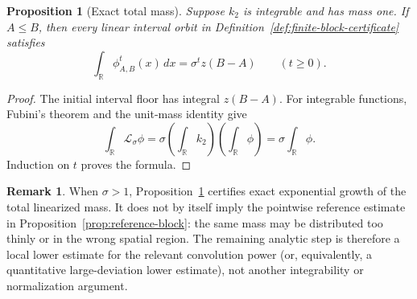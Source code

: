 \documentclass[11pt]{article}
\newtheorem{proposition}[theorem]{Proposition}
\theoremstyle{definition}
\newtheorem{remark}[theorem]{Remark}
\newcommand{\R}{\mathbb R}
\begin{document}
\begin{proposition}[Exact total mass]
\label{prop:block-total-mass}
Suppose \(k_2\) is integrable and has mass one.  If \(A\leq B\), then every
linear interval orbit in Definition~\ref{def:finite-block-certificate}
satisfies
\[
  \int_{\R}\phi_{A,B}^{t}(x)\,dx
  =
  \sigma^t z(B-A)
  \qquad(t\geq0).
\]
\end{proposition}

\begin{proof}
The initial interval floor has integral \(z(B-A)\).  For integrable
functions, Fubini's theorem and the unit-mass identity give
\[
  \int_{\R}\mathcal L_\sigma\phi
  =
  \sigma
  \left(\int_{\R}k_2\right)
  \left(\int_{\R}\phi\right)
  =
  \sigma\int_{\R}\phi.
\]
Induction on \(t\) proves the formula.
\end{proof}

\begin{remark}
When \(\sigma>1\), Proposition~\ref{prop:block-total-mass} certifies exact
exponential growth of the total linearized mass.  It does not by itself
imply the pointwise reference estimate in
Proposition~\ref{prop:reference-block}: the same mass may be distributed too
thinly or in the wrong spatial region.  The remaining analytic step is
therefore a local lower estimate for the relevant convolution power (or,
equivalently, a quantitative large-deviation lower estimate), not another
integrability or normalization argument.
\end{remark}
\end{document}
